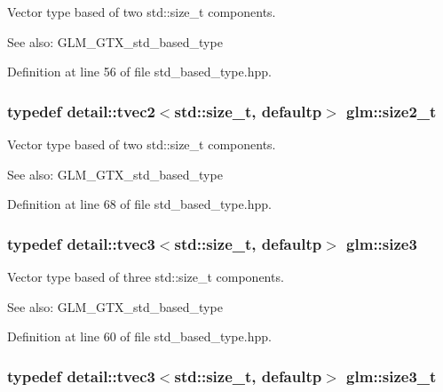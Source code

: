 Vector type based of two std::size\_\-t components. \begin{Desc}
\item[See also:]GLM\_\-GTX\_\-std\_\-based\_\-type \end{Desc}


Definition at line 56 of file std\_\-based\_\-type.hpp.\hypertarget{group__gtx__std__based__type_g64be170f9203528ff59efa40b1977bb0}{
\subsubsection[size2\_\-t]{\setlength{\rightskip}{0pt plus 5cm}typedef detail::tvec2$<$std::size\_\-t, defaultp$>$ {\bf glm::size2\_\-t}}}
\label{group__gtx__std__based__type_g64be170f9203528ff59efa40b1977bb0}


Vector type based of two std::size\_\-t components. \begin{Desc}
\item[See also:]GLM\_\-GTX\_\-std\_\-based\_\-type \end{Desc}


Definition at line 68 of file std\_\-based\_\-type.hpp.\hypertarget{group__gtx__std__based__type_ge1dda4cdccd4c1abeeb2e470c048d0c9}{
\subsubsection[size3]{\setlength{\rightskip}{0pt plus 5cm}typedef detail::tvec3$<$std::size\_\-t, defaultp$>$ {\bf glm::size3}}}
\label{group__gtx__std__based__type_ge1dda4cdccd4c1abeeb2e470c048d0c9}


Vector type based of three std::size\_\-t components. \begin{Desc}
\item[See also:]GLM\_\-GTX\_\-std\_\-based\_\-type \end{Desc}


Definition at line 60 of file std\_\-based\_\-type.hpp.\hypertarget{group__gtx__std__based__type_gd9ddaab6dd4c37ba46b74a1423ef2ba3}{
\subsubsection[size3\_\-t]{\setlength{\rightskip}{0pt plus 5cm}typedef detail::tvec3$<$std::size\_\-t, defaultp$>$ {\bf glm::size3\_\-t}}}
\label{group__gtx__std__based__type_gd9ddaab6dd4c37ba46b74a1423ef2ba3}


